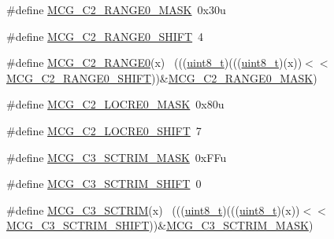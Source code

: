 \begin{DoxyCompactItemize}
\item 
\#define \hyperlink{group___m_c_g___register___masks_ga5436f4e93034d8536c23eabcac1b1a43}{M\+C\+G\+\_\+\+C2\+\_\+\+R\+A\+N\+G\+E0\+\_\+\+M\+A\+SK}~0x30u
\item 
\#define \hyperlink{group___m_c_g___register___masks_gaca9dfaea66978e556c7a9773e2c8c531}{M\+C\+G\+\_\+\+C2\+\_\+\+R\+A\+N\+G\+E0\+\_\+\+S\+H\+I\+FT}~4
\item 
\#define \hyperlink{group___m_c_g___register___masks_ga41d54c406df1619eeea11097d619c6a7}{M\+C\+G\+\_\+\+C2\+\_\+\+R\+A\+N\+G\+E0}(x)                                              ~(((\hyperlink{_p_e___types_8h_aba7bc1797add20fe3efdf37ced1182c5}{uint8\+\_\+t})(((\hyperlink{_p_e___types_8h_aba7bc1797add20fe3efdf37ced1182c5}{uint8\+\_\+t})(x))$<$$<$\hyperlink{group___m_c_g___register___masks_gaca9dfaea66978e556c7a9773e2c8c531}{M\+C\+G\+\_\+\+C2\+\_\+\+R\+A\+N\+G\+E0\+\_\+\+S\+H\+I\+FT}))\&\hyperlink{group___m_c_g___register___masks_ga5436f4e93034d8536c23eabcac1b1a43}{M\+C\+G\+\_\+\+C2\+\_\+\+R\+A\+N\+G\+E0\+\_\+\+M\+A\+SK})
\item 
\#define \hyperlink{group___m_c_g___register___masks_gae89f2e48b02a39563115d1a60dc8f16f}{M\+C\+G\+\_\+\+C2\+\_\+\+L\+O\+C\+R\+E0\+\_\+\+M\+A\+SK}~0x80u
\item 
\#define \hyperlink{group___m_c_g___register___masks_gabc900505d9a12bd7a33c2a5e3cfdf02a}{M\+C\+G\+\_\+\+C2\+\_\+\+L\+O\+C\+R\+E0\+\_\+\+S\+H\+I\+FT}~7
\item 
\#define \hyperlink{group___m_c_g___register___masks_ga44433c6372539508fbf3090b591f3d89}{M\+C\+G\+\_\+\+C3\+\_\+\+S\+C\+T\+R\+I\+M\+\_\+\+M\+A\+SK}~0x\+F\+Fu
\item 
\#define \hyperlink{group___m_c_g___register___masks_ga8b5c3c55be188745fefec24b945110b7}{M\+C\+G\+\_\+\+C3\+\_\+\+S\+C\+T\+R\+I\+M\+\_\+\+S\+H\+I\+FT}~0
\item 
\#define \hyperlink{group___m_c_g___register___masks_ga6b77fdc5ccef1d81f2f78baa917b117c}{M\+C\+G\+\_\+\+C3\+\_\+\+S\+C\+T\+R\+IM}(x)                                              ~(((\hyperlink{_p_e___types_8h_aba7bc1797add20fe3efdf37ced1182c5}{uint8\+\_\+t})(((\hyperlink{_p_e___types_8h_aba7bc1797add20fe3efdf37ced1182c5}{uint8\+\_\+t})(x))$<$$<$\hyperlink{group___m_c_g___register___masks_ga8b5c3c55be188745fefec24b945110b7}{M\+C\+G\+\_\+\+C3\+\_\+\+S\+C\+T\+R\+I\+M\+\_\+\+S\+H\+I\+FT}))\&\hyperlink{group___m_c_g___register___masks_ga44433c6372539508fbf3090b591f3d89}{M\+C\+G\+\_\+\+C3\+\_\+\+S\+C\+T\+R\+I\+M\+\_\+\+M\+A\+SK})
\item 

\end{DoxyCompactItemize}

